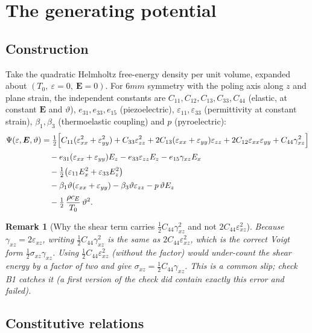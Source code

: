\documentclass[11pt]{article}
\newcommand{\s}{\sigma}
\newcommand{\eps}{\varepsilon}
\newcommand{\bth}{\vartheta}
\newcommand{\E}{\bm{E}}
\theoremstyle{plain}
\newtheorem{remark}{Remark}
\begin{document}
\section{The generating potential}
\label{sec:potential}

\subsection{Construction}

Take the quadratic Helmholtz free-energy density per unit volume, expanded about
$(T_0,\ \eps=0,\ \E=0)$. For $6mm$ symmetry with the poling axis along $z$ and
plane strain, the independent constants are $C_{11},C_{12},C_{13},C_{33},C_{44}$
(elastic, at constant $\E$ and $\bth$), $e_{31},e_{33},e_{15}$ (piezoelectric),
$\eps_{11},\eps_{33}$ (permittivity at constant strain), $\beta_1,\beta_3$
(thermoelastic coupling) and $p$ (pyroelectric):
\begin{align}
  \Psi(\eps,\E,\bth) &=
  \tfrac12\Big[ C_{11}(\eps_{xx}^2+\eps_{yy}^2) + C_{33}\eps_{zz}^2
    + 2C_{13}(\eps_{xx}+\eps_{yy})\eps_{zz}
    + 2C_{12}\eps_{xx}\eps_{yy} + C_{44}\gamma_{xz}^2 \Big] \notag\\[2pt]
  &\quad - e_{31}(\eps_{xx}+\eps_{yy})E_z - e_{33}\eps_{zz}E_z
    - e_{15}\gamma_{xz}E_x \notag\\[2pt]
  &\quad - \tfrac12\big(\eps_{11}E_x^2 + \eps_{33}E_z^2\big) \notag\\[2pt]
  &\quad - \beta_1\bth(\eps_{xx}+\eps_{yy}) - \beta_3\bth\eps_{zz}
    - p\,\bth E_z \notag\\[2pt]
  &\quad - \tfrac12\,\frac{\rho c_E}{T_0}\,\bth^2 .
  \label{eq:psi}
\end{align}

\begin{remark}[Why the shear term carries $\tfrac12 C_{44}\gamma_{xz}^2$ and not $2C_{44}\eps_{xz}^2$]
Because $\gamma_{xz}=2\eps_{xz}$, writing $\tfrac12 C_{44}\gamma_{xz}^2$ is the
same as $2C_{44}\eps_{xz}^2$, which is the correct Voigt form
$\tfrac12\s_{xz}\gamma_{xz}$. Using $\tfrac12 C_{44}\eps_{xz}^2$ (without the
factor) would under-count the shear energy by a factor of two and give
$\s_{xz}=\tfrac12 C_{44}\gamma_{xz}$. This is a common slip; check B1 catches it
(a first version of the check did contain exactly this error and failed).
\end{remark}

\subsection{Constitutive relations}
\label{sec:constitutive}
\end{document}
